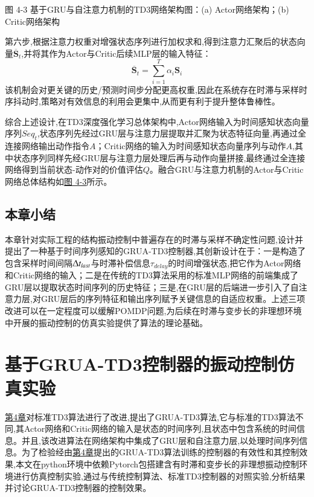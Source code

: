 \documentclass{scrbook}
\begin{document}
{{\par}{\centering 图 4-3 基于GRU与自注意力机制的TD3网络架构图：(a) Actor网络架构；(b) Critic网络架构\label{ref-068}

\par}第六步,根据注意力权重对增强状态序列进行加权求和,得到注意力汇聚后的状态向量$\overline{\mathbf{S}}_{t}$,并将其作为Actor与Critic后续MLP层的输入特征：
\begin{equation}
\tag{4-6}
\overline{\mathbf{S}}_{t}=\sum \limits_{i=1}^{T}\alpha _{i}\mathbf{S}_{i}
\end{equation}
该机制会对更关键的历史/预测时间步分配更高权重,因此在系统存在时滞与采样时序抖动时,策略对有效信息的利用会更集中,从而更有利于提升整体鲁棒性。

综合上述设计,在TD3深度强化学习总体架构中,Actor网络输入为时间感知状态向量序列$Seq_{t}$,状态序列先经过GRU层与注意力层提取并汇聚为状态特征向量,再通过全连接网络输出动作指令$A$；Critic网络的输入为时间感知状态向量序列与动作$A$,其中状态序列同样先经GRU层与注意力层处理后再与动作向量拼接,最终通过全连接网络得到当前状态-动作对的价值评估$Q$。融合GRU与注意力机制的Actor与Critic网络总体结构如{\hyperref[ref-068]{图 4-3}}所示。

\section{\label{ref-069}本章小结\label{mark-4.5}}

本章针对实际工程的结构振动控制中普遍存在的时滞与采样不确定性问题,设计并提出了一种基于时间序列感知的GRUA-TD3控制器,其创新设计在于：一是构造了包含采样时间间隔$\Updelta t_{last}$与时滞补偿信息$\tau _{\textit{delay}}$的时间增强状态,把它作为Actor网络和Critic网络的输入；二是在传统的TD3算法采用的标准MLP网络的前端集成了GRU层以提取状态时间序列的历史特征；三是,在GRU层的后端进一步引入了自注意力层,对GRU层后的序列特征和输出序列赋予关键信息的自适应权重。上述三项改进可以在一定程度可以缓解POMDP问题,为后续在时滞与变步长的非理想环境中开展的振动控制的仿真实验提供了算法的理论基础。

\chapter{\label{ref-070}\newline
\label{ref-071}基于GRUA-TD3控制器的振动控制仿真实验\label{mark-第5章}}

{\hyperref[ref-058]{第4章}}对标准TD3算法进行了改进,提出了GRUA-TD3算法,它与标准的TD3算法不同,其Actor网络和Critic网络的输入是状态的时间序列,且状态中包含系统的时间信息。并且,该改进算法在网络架构中集成了GRU层和自注意力层,以处理时间序列信息。为了检验经由{\hyperref[ref-058]{第4章}}提出的GRUA-TD3算法训练的控制器的有效性和其控制效果,本文在python环境中依赖Pytorch包搭建含有时滞和变步长的非理想振动控制环境进行仿真控制实验,通过与传统控制算法、标准TD3控制器的对照实验,分析结果并讨论GRUA-TD3控制器的控制效果。

}
\end{document}
